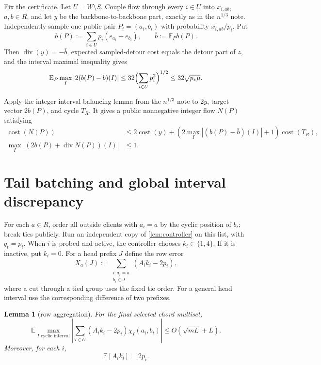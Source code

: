 \documentclass[11pt]{article}
\newtheorem{lemma}[theorem]{Lemma}
\theoremstyle{remark}
\newcommand{\E}{\mathbb E}
\newcommand{\cost}{\operatorname{cost}}
\newcommand{\divg}{\operatorname{div}}
\begin{document}
Fix the certificate.  Let $U=W\setminus S$.  Couple flow through every
$i\in U$ into $x_{i,ab}$, $a,b\in R$, and let $y$ be the backbone-to-backbone
part, exactly as in the $n^{1/3}$ note.  Independently sample one public pair
$P_i=(a_i,b_i)$ with probability $x_{i,ab}/p_i$.  Put
\[
 b(P):=\sum_{i\in U}p_i(e_{a_i}-e_{b_i}),
 \qquad
 \bar b:=\E_Pb(P).
\]
Then $\divg(y)=-\bar b$, expected sampled-detour cost equals the detour part
of $z$, and the interval maximal inequality gives
\begin{equation}\label{eq:endpoint-error}
 \E_P\max_I|2(b(P)-\bar b)(I)|
 \le32\Bigl(\sum_{i\in U}p_i^2\Bigr)^{1/2}
 \le32\sqrt{p_*\mu}.
\end{equation}

Apply the integer interval-balancing lemma from the $n^{1/3}$ note to
$2y$, target vector $2b(P)$, and cycle $T_R$.  It gives a public nonnegative
integer flow $N(P)$ satisfying
\begin{align}
 \cost(N(P))
 &\le2\cost(y)+
 \left(2\max_I|(b(P)-\bar b)(I)|+1\right)\cost(T_R),
 \label{eq:N-cost}\\
 \max_I|(2b(P)+\divg N(P))(I)|&\le1.
 \label{eq:N-balance}
\end{align}

\section{Tail batching and global interval discrepancy}

For each $a\in R$, order all outside clients with $a_i=a$ by the cyclic
position of $b_i$; break ties publicly.  Run an independent copy of
\cref{lem:controller} on this list, with $q_t=p_i$.  When $i$ is probed and
active, the controller chooses $k_i\in\{1,4\}$.  If it is inactive, put
$k_i=0$.  For a head prefix $J$ define the row error
\[
 X_a(J):=\sum_{\substack{i:a_i=a\\b_i\in J}}
          (A_i k_i-2p_i),
\]
where a cut through a tied group uses the fixed tie order.  For a general
head interval use the corresponding difference of two prefixes.

\begin{lemma}[row aggregation]\label{lem:rows}
For the final selected chord multiset,
\begin{equation}\label{eq:row-bound}
 \E\max_{I\text{ cyclic interval}}
 \left|\sum_{i\in U}(A_i k_i-2p_i)
                  \chi_I(a_i,b_i)\right|
 \le O(\sqrt{mL}+L).
\end{equation}
Moreover, for each $i$,
\begin{equation}\label{eq:two-p}
 \E[A_i k_i]=2p_i.
\end{equation}
\end{lemma}
\end{document}
